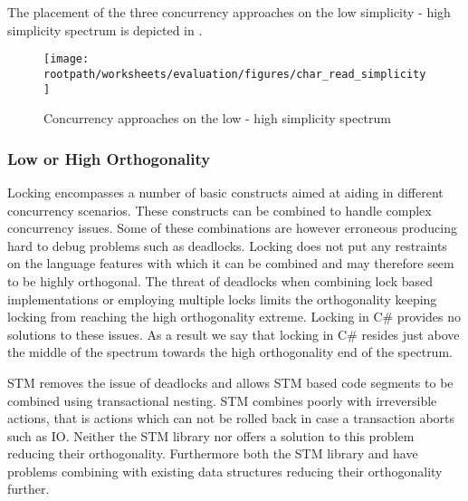 The placement of the three concurrency approaches on the low simplicity - high simplicity spectrum is depicted in .

\begin{figure}[htbp]
\centering
 \texttt{[image: \\rootpath/worksheets/evaluation/figures/char\_read\_simplicity]} 
 \caption{Concurrency approaches on the low - high simplicity spectrum}
\label{fig:char_simplicity}
\end{figure}
\subsubsection{Low or High Orthogonality}\label{subsec:orthogonality}
Locking encompasses a number of basic constructs aimed at aiding in different concurrency scenarios. These constructs can be combined to handle complex concurrency issues. Some of these combinations are however erroneous producing hard to debug problems such as deadlocks. Locking does not put any restraints on the language features with which it can be combined and may therefore seem to be highly orthogonal. The threat of deadlocks when combining lock based implementations or employing multiple locks limits the orthogonality keeping locking from reaching the high orthogonality extreme. Locking in C\# provides no solutions to these issues. As a result we say that locking in C\# resides just above the middle of the spectrum towards the high orthogonality end of the spectrum.

\ac{STM} removes the issue of deadlocks and allows \ac{STM} based code segments to be combined using transactional nesting. \ac{STM} combines poorly with irreversible actions, that is actions which can not be rolled back in case a transaction aborts such as \ac{IO}. Neither the \ac{STM} library nor \stmnamesp offers a solution to this problem reducing their orthogonality. Furthermore both the \ac{STM} library and \stmnamesp have problems combining with existing data structures reducing their orthogonality further.

